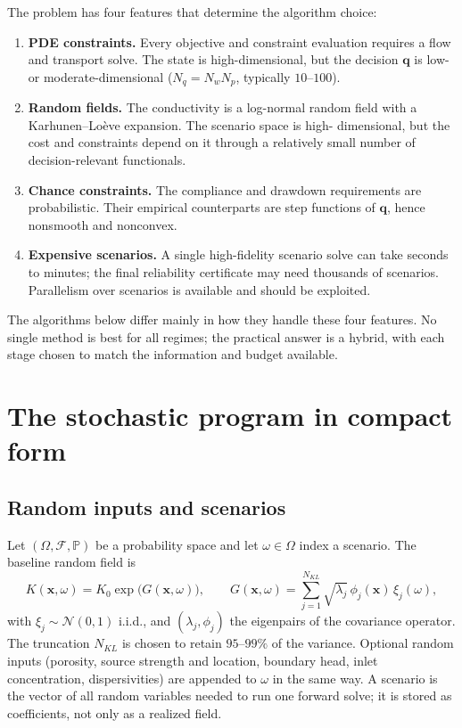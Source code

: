 \documentclass[11pt]{article}
\numberwithin{equation}{section}
\newcommand{\Prob}{\mathbb{P}}
\newcommand{\xx}{\mathbf{x}}
\newcommand{\qq}{\mathbf{q}}
\theoremstyle{plain}
\begin{document}
The problem has four features that determine the algorithm choice:
\begin{enumerate}[leftmargin=1.6em,itemsep=2pt]
  \item \textbf{PDE constraints.}  Every objective and constraint evaluation
        requires a flow and transport solve.  The state is high-dimensional,
        but the decision $\qq$ is low- or moderate-dimensional
        ($N_q=N_wN_p$, typically $10$--$100$).
  \item \textbf{Random fields.}  The conductivity is a log-normal random field
        with a Karhunen--Lo\`eve expansion.  The scenario space is high-
        dimensional, but the cost and constraints depend on it through a
        relatively small number of decision-relevant functionals.
  \item \textbf{Chance constraints.}  The compliance and drawdown
        requirements are probabilistic.  Their empirical counterparts are
        step functions of $\qq$, hence nonsmooth and nonconvex.
  \item \textbf{Expensive scenarios.}  A single high-fidelity scenario solve
        can take seconds to minutes; the final reliability certificate may
        need thousands of scenarios.  Parallelism over scenarios is available
        and should be exploited.
\end{enumerate}

The algorithms below differ mainly in how they handle these four features.
No single method is best for all regimes; the practical answer is a hybrid,
with each stage chosen to match the information and budget available.

\section{The stochastic program in compact form}
\label{sec:problem}

\subsection{Random inputs and scenarios}

Let $(\Omega,\mathcal{F},\Prob)$ be a probability space and let
$\omega\in\Omega$ index a scenario.  The baseline random field is
\begin{equation}
\label{eq:lognormal}
K(\xx,\omega)=K_0\exp\bigl(G(\xx,\omega)\bigr),
\qquad
G(\xx,\omega)=\sum_{j=1}^{N_{KL}}\sqrt{\lambda_j}\,\phi_j(\xx)\,\xi_j(\omega),
\end{equation}
with $\xi_j\sim\mathcal{N}(0,1)$ i.i.d., and $(\lambda_j,\phi_j)$ the
eigenpairs of the covariance operator.  The truncation $N_{KL}$ is chosen to
retain $95$--$99\%$ of the variance.  Optional random inputs (porosity, source
strength and location, boundary head, inlet concentration, dispersivities) are
appended to $\omega$ in the same way.  A scenario is the vector of all random
variables needed to run one forward solve; it is stored as coefficients, not
only as a realized field.
\end{document}
